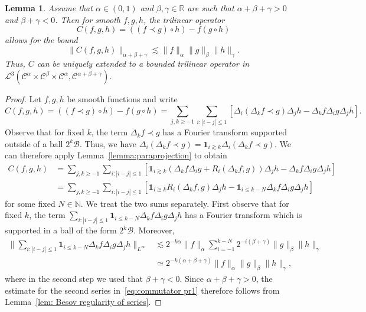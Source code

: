 \documentclass[11pt,a4paper]{article}
\newtheorem{lemma}[theorem]{Lemma}
\theoremstyle{remark}
\newcommand{\Lcal}{\mathcal{L}}
\newcommand{\CB}{\ensuremath{\mathscr{B}}}
\newcommand{\CC}{\ensuremath{\mathscr{C}}}
\begin{document}
\begin{lemma}\label{lemma:commutator}
   Assume that $\alpha \in ( 0,1 )$ and $\beta , \gamma \in \mathbb{R}$ are such that $\alpha + \beta + \gamma >0$ and $\beta + \gamma <0$. Then for smooth $f,g,h$, the trilinear operator
  \[
     C ( f,g,h ) = ( ( f \prec g ) \circ h ) -f ( g \circ h )
  \]
  allows for the bound
  \[
     \| C ( f,g,h ) \|_{\alpha + \beta + \gamma} \lesssim \| f \|_{\alpha} \|  g \|_{\beta} \| h \|_{\gamma} .
  \]
  Thus, $C$ can be uniquely extended to a bounded trilinear operator in $\Lcal^{3} \left( \CC^{\alpha}\! \times\! \CC^{\beta}\! \times\! \CC^{\alpha}, \CC^{\alpha + \beta + \gamma} \right)$.
\end{lemma}

\begin{proof}
  Let $f,g,h$ be smooth functions and write
  \[
     C ( f,g,h ) = ( ( f \prec g ) \circ h ) -f ( g \circ h ) = \sum_{j,k  \geqslant -1} \sum_{i: | i-j | \leqslant 1} [ \Delta_{i} ( \Delta_{k} f  \prec g ) \Delta_{j} h- \Delta_{k} f \Delta_{i} g \Delta_{j} h ].
  \]
  Observe that for fixed $k$, the term $\Delta_{k} f \prec g$ has a Fourier transform supported outside of a ball $2^{k} \CB$. Thus, we have $\Delta_{i}( \Delta_{k} f \prec g ) = \mathbf{1}_{i \gtrsim k} \Delta_{i} ( \Delta_{k}f \prec g )$. We can therefore apply Lemma~\ref{lemma:paraprojection} to obtain
  \begin{align}\label{eq:commutator pr1}\nonumber
     C ( f,g,h ) &= \sum_{j,k \geqslant -1} \sum_{i: | i-j | \leqslant 1} [\mathbf{1}_{i \gtrsim k} ( \Delta_{k} f \Delta_{i} g+R_{i} ( \Delta_{k} f,g ) ) \Delta_{j} h- \Delta_{k} f \Delta_{i} g \Delta_{j} h] \\
    &= \sum_{j,k \geqslant -1} \sum_{i: | i-j | \leqslant 1} [\mathbf{1}_{i \gtrsim k} R_{i} ( \Delta_{k} f,g ) \Delta_{j} h -  \mathbf{1}_{i \leqslant k-N} \Delta_{k} f \Delta_{i} g \Delta_{j} h]
  \end{align}
  for some fixed $N \in \mathbb{N}$. We treat the two sums separately. First
  observe that for fixed $k$, the term $\sum_{i: | i-j | \leqslant 1} \mathbf{1}_{i \leqslant k-N} \Delta_{k} f \Delta_{i} g \Delta_{j} h$ has a
  Fourier transform which is supported in a ball of the form $2^{k} \CB$.
  Moreover,
  \begin{align*}
     \Bigg\| \sum_{i: | i-j | \leqslant 1} \mathbf{1}_{i \leqslant k-N} \Delta_{k} f \Delta_{i} g \Delta_{j} h \Bigg\|_{L^{\infty}} & \lesssim 2^{-k \alpha} \| f \|_{\alpha} \sum_{i=-1}^{k-N} 2^{-i ( \beta + \gamma)} \| g \|_{\beta} \| h \|_{\gamma} \\
     & \simeq 2^{-k ( \alpha + \beta + \gamma )} \| f \|_{\alpha} \| g \|_{\beta} \| h \|_{\gamma},
  \end{align*}
  where in the second step we used that $\beta + \gamma <0$. Since $\alpha +  \beta + \gamma >0$, the estimate for the second series
  in~{\eqref{eq:commutator pr1}} therefore follows from Lemma~\ref{lem: Besov regularity of series}.
  

\end{proof}
\end{document}
